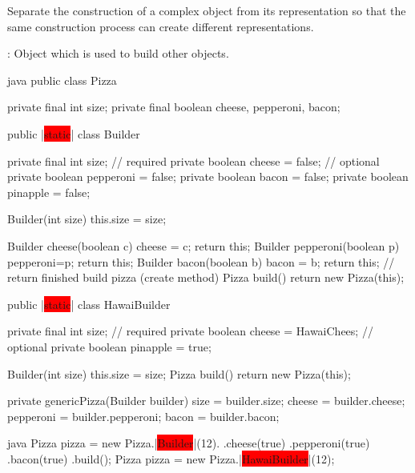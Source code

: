 \begin{figure}[H]	
  \centering
    \resizebox{\linewidth}{!}{\tikzset{font=\Huge}}
\end{figure}
\begin{intentbox}[Intent]
  Separate the construction of a complex object from its representation so
that the same construction process can create different representations.
\end{intentbox}
\begin{partbox}[Participants]
  \begin{itemizenosep}
      \item {}: Object which is used to build other objects.
  \end{itemizenosep}
\end{partbox}
\begin{codeboxNl}{java}
public class Pizza {
  private final int size;
  private final boolean cheese, pepperoni, bacon;

  public |\colorbox{Red}{static}| class Builder {
    private final int size;  // required 
    private boolean cheese = false;  // optional
    private boolean pepperoni = false;
    private boolean bacon = false;
    private boolean pinapple = false;

    Builder(int size) { this.size = size; }

    Builder cheese(boolean c) { cheese = c; return this; }
    Builder pepperoni(boolean p) { pepperoni=p; return this; }
    Builder bacon(boolean b) { bacon = b; return this; }
    // return finished build pizza (create method)
    Pizza build() { return new Pizza(this); }
  }  

  public |\colorbox{Red}{static}| class HawaiBuilder {
    private final int size;  // required 
    private boolean cheese = HawaiChees;  // optional
    private boolean pinapple = true;

    Builder(int size) { this.size = size; }
    Pizza build() { return new Pizza(this); }
  }  

  private genericPizza(Builder builder) {
      size = builder.size;
      cheese = builder.cheese;
      pepperoni = builder.pepperoni;
      bacon = builder.bacon;
  }
}
\end{codeboxNl}
\begin{codeboxNl}[Usage]{java}
  Pizza pizza = new Pizza.|\colorbox{Red}{Builder}|(12).
                                .cheese(true)
                                .pepperoni(true)
                                .bacon(true)
                                .build();
  Pizza pizza = new Pizza.|\colorbox{Red}{HawaiBuilder}|(12);
\end{codeboxNl}

